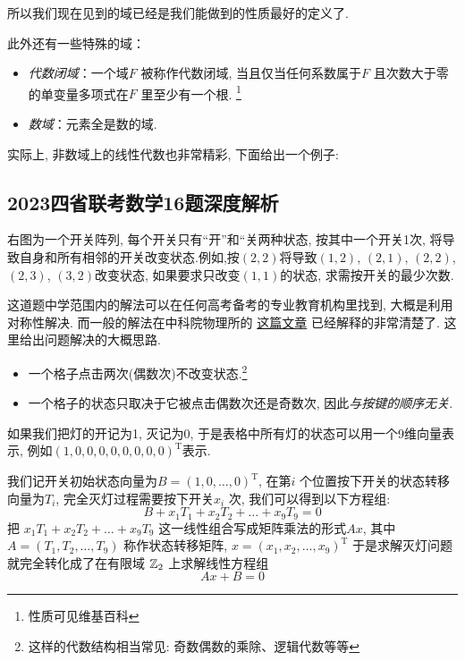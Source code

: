 所以我们现在见到的域已经是我们能做到的性质最好的定义了.

此外还有一些特殊的域：
\begin{itemize}
    \item \emph{代数闭域}：一个域\(F\) 被称作代数闭域, 当且仅当任何系数属于\(F\)
        且次数大于零的单变量多项式在\(F\) 里至少有一个根. \footnote{性质可见维基百科}
    \item \emph{数域}：元素全是数的域.
\end{itemize}
实际上, 非数域上的线性代数也非常精彩, 下面给出一个例子:

\subsection{2023四省联考数学16题深度解析}

\begin{problem}
    右图为一个开关阵列, 每个开关只有“开”和“关两种状态, 按其中一个开关1次,
    将导致自身和所有相邻的开关改变状态.例如,按\((2,2)\)将导致\((1,2)\), \((2,1)\),
    \((2,2)\), \((2,3)\),
    \((3,2)\)改变状态, 如果要求只改变\((1,1)\)的状态, 求需按开关的最少次数.
\end{problem}

这道题中学范围内的解法可以在任何高考备考的专业教育机构里找到, 大概是利用对称性解决. 而一般的解法在中科院物理所的
\href{https://mp.weixin.qq.com/s/k15Xlib2k9JOVrvBifQoiQ}{这篇文章}
已经解释的非常清楚了. 这里给出问题解决的大概思路.

\begin{itemize}
    \item 一个格子点击两次(偶数次)不改变状态.\footnote{这样的代数结构相当常见: 奇数偶数的乘除、逻辑代数等等}
    \item 一个格子的状态只取决于它被点击偶数次还是奇数次, 因此\emph{与按键的顺序无关}.
\end{itemize}

如果我们把灯的开记为1, 灭记为0, 于是表格中所有灯的状态可以用一个9维向量表示,
例如\((1,0,0,0,0,0,0,0,0)^{\mathrm{T}}\)表示.

我们记开关初始状态向量为\(B=(1,0,\dots,0)^{\mathrm{T}}\), 在第\(i\)
个位置按下开关的状态转移向量为\(T_{i}\), 完全灭灯过程需要按下开关\(x_{i}\) 次, 我们可以得到以下方程组:
\[
    B+ x_{1}T_{1}+x_{2}T_{2}+\dots+x_{9}T_{9}=0
\]
把 \(x_{1}T_{1}+x_{2}T_{2}+\dots+x_{9}T_{9}\)
这一线性组合写成矩阵乘法的形式\(Ax\), 其中\(A=(T_{1}, T_{2}, \dots,
T_{9})\) 称作状态转移矩阵, \(x=(x_{1}, x_{2}, \dots, x_{9})^{\mathrm{T}}\)
于是求解灭灯问题就完全转化成了在有限域
\(\mathbb{Z}_{2}\) 上求解线性方程组\[
    Ax+B=0
\]

